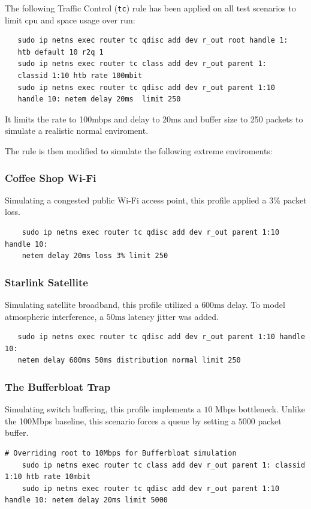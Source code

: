 \documentclass[12pt,a4paper]{article}
\begin{document}
The following Traffic Control (\texttt{tc}) rule has been applied on all test scenarios to limit cpu and space usage over run:

\begin{verbatim}
   sudo ip netns exec router tc qdisc add dev r_out root handle 1: 
   htb default 10 r2q 1
   sudo ip netns exec router tc class add dev r_out parent 1: 
   classid 1:10 htb rate 100mbit
   sudo ip netns exec router tc qdisc add dev r_out parent 1:10 
   handle 10: netem delay 20ms  limit 250
\end{verbatim}

It limits the rate to 100mbps and delay to 20ms and buffer size to 250 packets to simulate a realistic normal enviroment.

The rule is then modified to simulate the following extreme enviroments:

\subsubsection{Coffee Shop Wi-Fi}
Simulating a congested public Wi-Fi access point, this profile applied a $3\%$  packet loss.

\begin{verbatim}
    sudo ip netns exec router tc qdisc add dev r_out parent 1:10 handle 10: 
    netem delay 20ms loss 3% limit 250
\end{verbatim}

\subsubsection{Starlink Satellite}
Simulating satellite broadband, this profile utilized a $600\text{ms}$  delay. To model atmospheric interference, a $50\text{ms}$ latency jitter was added.

\begin{verbatim}
   sudo ip netns exec router tc qdisc add dev r_out parent 1:10 handle 10: 
   netem delay 600ms 50ms distribution normal limit 250
\end{verbatim}

\subsubsection{The Bufferbloat Trap}
Simulating switch buffering, this profile implements a $10\text{ Mbps}$ bottleneck. Unlike the 100Mbps baseline, this scenario forces a queue by setting a $5000$ packet buffer. 

\begin{verbatim}
# Overriding root to 10Mbps for Bufferbloat simulation
    sudo ip netns exec router tc class add dev r_out parent 1: classid 1:10 htb rate 10mbit
    sudo ip netns exec router tc qdisc add dev r_out parent 1:10 handle 10: netem delay 20ms limit 5000
\end{verbatim}
\end{document}
